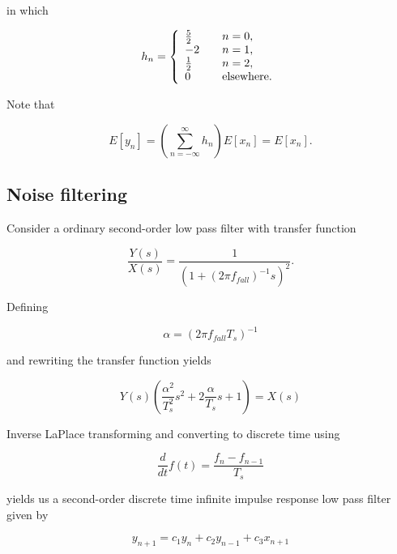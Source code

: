 \documentclass[11pt,titlepage]{report}
\begin{document}
in which

\begin{equation}
	h_n = \left\{
	\begin{array}{l l}
		\frac{5}{2} & \quad n = 0, \\
		-2 & \quad n = 1, \\
		\frac{1}{2} & \quad n = 2, \\
		0 & \quad \text{elsewhere}.
	\end{array}
	\right.
\end{equation}

Note that

\begin{equation}
	E[y_n] = \left( \sum_{n=-\infty}^{\infty} h_n \right) E[x_n] = E[x_n].
\end{equation}

\subsection{Noise filtering}

Consider a ordinary second-order low pass filter with transfer function

\begin{equation}
	\frac{Y(s)}{X(s)}=\frac{1}{(1+(2 \pi f_{fall})^{-1} s)^2}.
\end{equation}

Defining

\begin{equation}
	\alpha = (2 \pi f_{fall} T_s)^{-1}
\end{equation}

and rewriting the transfer function yields

\begin{equation}
	Y(s) \left(\frac{\alpha^2}{T_s^2} s^2 + 2 \frac{\alpha}{T_s} s + 1 \right) = X(s)
\end{equation}

Inverse LaPlace transforming and converting to discrete time using

\begin{equation}
	\frac{d}{dt}f(t) = \frac{f_n - f_{n-1}}{T_s}
\end{equation}

yields us a second-order discrete time infinite impulse response low pass filter given by

\begin{equation}
	y_{n+1} = c_1 y_n + c_2 y_{n-1} + c_3 x_{n+1}
\end{equation}
\end{document}
